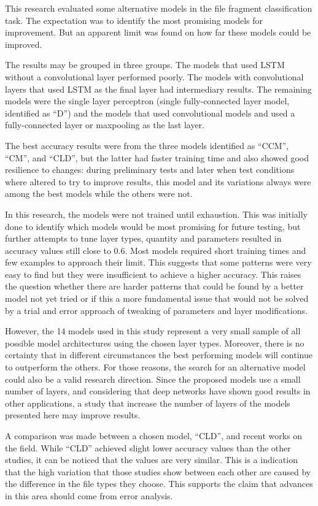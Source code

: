 This research evaluated some alternative models in the file fragment classification task. The expectation was to identify the most promising models for improvement. But an apparent limit was found on how far these models could be improved.

The results may be grouped in three groups. The models that used LSTM without a convolutional layer performed poorly. The models with convolutional layers that used LSTM as the final layer had intermediary results. The remaining models were the single layer perceptron (single fully-connected layer model, identified as ``D'') and the models that used convolutional models and used a fully-connected layer or maxpooling as the last layer.

The best accuracy results were from the three models identified as ``CCM'', ``CM'', and ``CLD'', but the latter had faster training time and also showed good resilience to changes: during preliminary tests and later when test conditions where altered to try to improve results, this model and its variations always were among the best models while the others were not.

In this research, the models were not trained until exhaustion.
This was initially done to identify which models would be most promising for future testing, but further attempts to tune layer types, quantity and parameters resulted in accuracy values still close to 0.6.
Most models required short training times and few examples to approach their limit.
This suggests that some patterns were very easy to find but they were insufficient to achieve a higher accuracy.
This raises the question whether there are harder patterns that could be found by a better model not yet tried or if this a more fundamental issue that would not be solved by a trial and error approach of tweaking of parameters and layer modifications.


However, the 14 models used in this study represent a very small sample of all possible model architectures using the chosen layer types. Moreover, there is no certainty that in different circumstances the best performing models will continue to outperform the others. For those reasons, the search for an alternative model could also be a valid research direction. Since the proposed models use a small number of layers, and considering that deep networks have shown good results in other applications, a study that increase the number of layers of the models presented here may improve results.

A comparison was made between a chosen model, ``CLD'', and recent works on the field. While ``CLD'' achieved slight lower accuracy values than the other studies, it can be noticed that the values are very similar. This is a indication that the high  variation that those studies show between each other are caused by the difference in the file types they choose. This supports the claim that advances in this area should come from error analysis.

